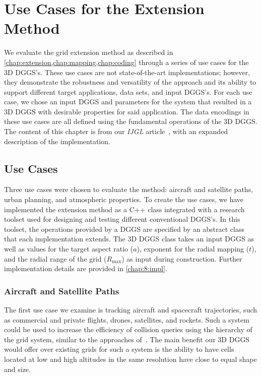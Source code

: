 \chapter{Use Cases for the Extension Method} \label{chap:usecases}
We evaluate the grid extension method as described in \cref{chap:extension,chap:mapping,chap:coding} through a series of use cases for the 3D DGGS's.
These use cases are not state-of-the-art implementations; however, they demonstrate the robustness and versatility of the approach and its ability to support different target applications, data sets, and input DGGS's.
For each use case, we chose an input DGGS and parameters for the system that resulted in a 3D DGGS with desirable properties for said application.
The data encodings in these use cases are all defined using the fundamental operations of the 3D DGGS.
The content of this chapter is from our \textit{IJGL} article~\cite{ulmer2020general}, with an expanded description of the implementation.


\section{Use Cases}
Three use cases were chosen to evaluate the method: aircraft and satellite paths, urban planning, and atmospheric properties.
To create the use cases, we have implemented the extension method as a C++ class integrated with a research toolset used for designing and testing different conventional DGGS's.
In this toolset, the operations provided by a DGGS are specified by an abstract class that each implementation extends.
The 3D DGGS class takes an input DGGS as well as values for the target aspect ratio ($a$), exponent for the radial mapping ($t$), and the radial range of the grid ($R_\mathrm{max}$) as input during construction.
Further implementation details are provided in \cref{chap:8:impl}.


\subsection{Aircraft and Satellite Paths} \label{chap:8:sats}
The first use case we examine is tracking aircraft and spacecraft trajectories, such as commercial and private flights, drones, satellites, and rockets.
Such a system could be used to increase the efficiency of collision queries using the hierarchy of the grid system, similar to the approaches of~\cite{miao2019low, zhai2019collision}.
The main benefit our 3D DGGS would offer over existing grids for such a system is the ability to have cells located at low and high altitudes in the same resolution have close to equal shape and size.


